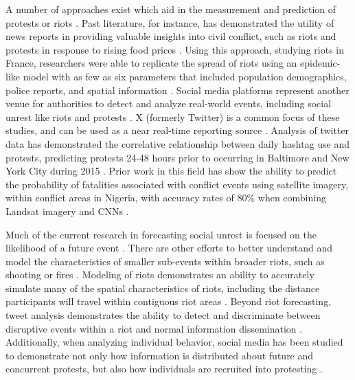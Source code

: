 A number of approaches exist which aid in the measurement and prediction of protests or riots \citep{wu2017forecasting}.  Past literature, for instance, has demonstrated the utility of news reports in providing valuable insights into civil conflict, such as riots and protests in response to rising food prices \citep{heslin2021riots}.  Using this approach, studying riots in France, researchers were able to replicate the spread of riots using an epidemic-like model with as few as six parameters that included population demographics, police reports, and spatial information \citep{bonnasse2018epidemiological}.  Social media platforms represent another venue for authorities to detect and analyze real-world events, including social unrest like riots and protests \citep{becker2011beyond, korolov2016predicting, petrovic2010streaming}.  X (formerly Twitter) is a common focus of these studies, and can be used as a near real-time reporting source \citep{becker2011beyond}.  Analysis of twitter data has demonstrated the correlative relationship between daily hashtag use and protests, predicting protests 24-48 hours prior to occurring in Baltimore and New York City during 2015 \citep{korolov2016predicting}.  Prior work in this field has show the ability to predict the probability of fatalities associated with conflict events using satellite imagery, within conflict areas in Nigeria, with accuracy rates of 80\% when combining Landsat imagery and CNNs \citep{goodman2021convolutional}. 

Much of the current research in forecasting social unrest is focused on the likelihood of a future event \citep{renaud2019social, phillips2017using, cadena2015forecasting, filchenkov2014more, compton2013detecting}.  There are other efforts to better understand and model the characteristics of smaller sub-events within broader riots, such as shooting or fires \citep{alsaedi2017can}.  Modeling of riots demonstrates an ability to accurately simulate many of the spatial characteristics of riots, including the distance participants will travel within contiguous riot areas \citep{davies2013mathematical}.  Beyond riot forecasting, tweet analysis demonstrates the ability to detect and discriminate between disruptive events within a riot and normal information dissemination \citep{alsaedi2015identifying}.  Additionally, when analyzing individual behavior, social media has been studied to demonstrate not only how information is distributed about future and concurrent protests, but also how individuals are recruited into protesting \citep{gonzalez2011dynamics}.

